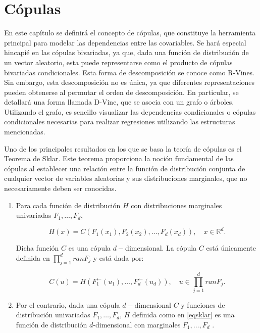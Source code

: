 
\chapter{Cópulas}\label{CapCopulas}

En este capítulo se definirá el concepto de cópulas, que constituye la herramienta principal para modelar las dependencias entre las covariables. Se hará especial hincapié en las cópulas bivariadas, ya que, dada una función de distribución de un vector aleatorio, esta puede representarse como el producto de cópulas bivariadas condicionales. Esta forma de descomposición se conoce como R-Vines. Sin embargo, esta descomposición no es única, ya que diferentes representaciones pueden obtenerse al permutar el orden de descomposición. En particular, se detallará una forma llamada D-Vine, que se asocia con un grafo o árboles. Utilizando el grafo, es sencillo visualizar las dependencias condicionales o cópulas condicionales necesarias para realizar regresiones utilizando las estructuras mencionadas.

Uno de los principales resultados en los que se basa la teoría de cópulas es el Teorema de Sklar. Este teorema proporciona la noción fundamental de las cópulas al establecer una relación entre la función de distribución conjunta de cualquier vector de variables aleatorias y sus distribuciones marginales, que no necesariamente deben ser conocidas. 


\begin{teor}\label{TeoSklar}
    \begin{enumerate}
    \item Para cada función de distribución $H$ con distribuciones marginales univariadas $F_1, \dots, F_d$, 
    
    \begin{equation}\label{eqsklar}
        H(x) = C(F_1(x_1), F_2(x_2), \dots, F_d(x_d)), \quad x \in \mathbb{R}^{d}.
    \end{equation}

    Dicha función $C$ es una cópula $d-$dimensional. La cópula $C$ está únicamente definida en $\prod_{j = 1}^{d}ran F_j$ y está dada por:

    \begin{equation}
        C(u) = H(F_1^{\leftarrow}(u_1), \dots, F_d^{\leftarrow}(u_d)), \quad u \in \prod_{j = 1}^{d}ran F_j.
    \end{equation}
    
    \item Por el contrario, dada una cópula $d-$dimensional $C$ y funciones de distribución univariadas $F_1, \dots, F_d$, $H$ definida como en \eqref{eqsklar} es una función de distribución $d$-dimensional con marginales $F_1, \dots, F_d$ \cite{CopulasR}.
    \end{enumerate}
\end{teor}

